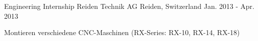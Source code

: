 \begin{cventries}
  \cventry
    {Engineering Internship} %
    {Reiden Technik AG} %
    {Reiden, Switzerland} %
    {Jan. 2013 - Apr. 2013} %
    {
      \begin{cvitems} %
        \item {Montieren verschiedene CNC-Maschinen (RX-Series: RX-10, RX-14, RX-18)}
      \end{cvitems}
    }


\end{cventries}
